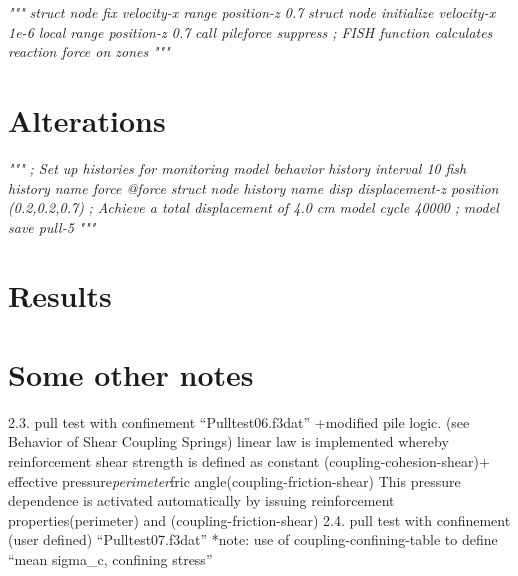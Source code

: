 \documentclass[a4paper, nobind]{templates/ociamthesis}
\newenvironment{Shaded}{\begin{snugshade}}{\end{snugshade}}
\newcommand{\CommentTok}[1]{\textcolor[rgb]{0.56,0.35,0.01}{\textit{#1}}}
\renewenvironment{Shaded}
{
  \vspace{10pt}%
  \begin{snugshade}%
}{%
  \end{snugshade}%
  \vspace{8pt}%
}
\begin{document}
\begin{Shaded}
\begin{Highlighting}[]
\CommentTok{"""}
\CommentTok{struct node fix velocity{-}x range position{-}z 0.7}
\CommentTok{struct node initialize velocity{-}x 1e{-}6 local range position{-}z 0.7}
\CommentTok{call \textquotesingle{}pileforce\textquotesingle{} suppress ; FISH function calculates reaction force on zones}
\CommentTok{"""}
\end{Highlighting}
\end{Shaded}

\hypertarget{alterations-1}{%
\section{Alterations}\label{alterations-1}}

\begin{Shaded}
\begin{Highlighting}[]
\CommentTok{"""}
\CommentTok{; Set up histories for monitoring model behavior}
\CommentTok{history interval 10}
\CommentTok{fish history name \textquotesingle{}force\textquotesingle{} @force}
\CommentTok{struct node history name \textquotesingle{}disp\textquotesingle{} displacement{-}z position (0.2,0.2,0.7)}
\CommentTok{; Achieve a total displacement of 4.0 cm}
\CommentTok{model cycle 40000}
\CommentTok{;}
\CommentTok{model save \textquotesingle{}pull{-}5\textquotesingle{}}
\CommentTok{"""}
\end{Highlighting}
\end{Shaded}

\hypertarget{results-1}{%
\section{Results}\label{results-1}}

\hypertarget{some-other-notes}{%
\section{Some other notes}\label{some-other-notes}}

2.3. pull test with confinement ``Pulltest06.f3dat''
+modified pile logic.
(see Behavior of Shear Coupling Springs) linear law is implemented
whereby reinforcement shear strength is defined as constant
(coupling-cohesion-shear)+ effective pressure\emph{perimeter}fric angle(coupling-friction-shear)
This pressure dependence is activated automatically by issuing
reinforcement properties(perimeter) and (coupling-friction-shear)
2.4. pull test with confinement (user defined) ``Pulltest07.f3dat''
*note: use of coupling-confining-table to define ``mean sigma\_c, confining stress''
\end{document}
